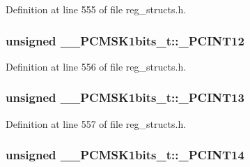 Definition at line 555 of file reg\+\_\+structs.\+h.

\hypertarget{union_____p_c_m_s_k1bits__t_af96f46cc69d6d9e5aacb61fd0470a7f2}{
\subsubsection[{\+\_\+\+P\+C\+I\+N\+T12}]{\setlength{\rightskip}{0pt plus 5cm}unsigned \+\_\+\+\_\+\+P\+C\+M\+S\+K1bits\+\_\+t\+::\+\_\+\+P\+C\+I\+N\+T12}}\label{union_____p_c_m_s_k1bits__t_af96f46cc69d6d9e5aacb61fd0470a7f2}


Definition at line 556 of file reg\+\_\+structs.\+h.

\hypertarget{union_____p_c_m_s_k1bits__t_a0ab65c152df9fb1bf73ea4ba991a9125}{
\subsubsection[{\+\_\+\+P\+C\+I\+N\+T13}]{\setlength{\rightskip}{0pt plus 5cm}unsigned \+\_\+\+\_\+\+P\+C\+M\+S\+K1bits\+\_\+t\+::\+\_\+\+P\+C\+I\+N\+T13}}\label{union_____p_c_m_s_k1bits__t_a0ab65c152df9fb1bf73ea4ba991a9125}


Definition at line 557 of file reg\+\_\+structs.\+h.

\hypertarget{union_____p_c_m_s_k1bits__t_ae614d00964087e02ed1c577e831a5188}{
\subsubsection[{\+\_\+\+P\+C\+I\+N\+T14}]{\setlength{\rightskip}{0pt plus 5cm}unsigned \+\_\+\+\_\+\+P\+C\+M\+S\+K1bits\+\_\+t\+::\+\_\+\+P\+C\+I\+N\+T14}}\label{union_____p_c_m_s_k1bits__t_ae614d00964087e02ed1c577e831a5188}


